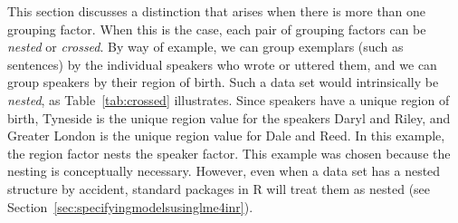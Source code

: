 \documentclass[a4paper,12pt]{article}
\begin{document}
This section discusses a distinction that arises when there is more than one grouping factor.
When this is the case, each pair of grouping factors can be \textit{nested} or \textit{crossed}.
By way of example, we can group exemplars (such as sentences) by the individual speakers who wrote or uttered them, and we can group speakers by their region of birth.
Such a data set would intrinsically be \textit{nested}, as Table~\ref{tab:crossed} illustrates.
Since speakers have a unique region of birth, Tyneside is the unique region value for the speakers Daryl and Riley, and Greater London is the unique region value for Dale and Reed.
In this example, the region factor nests the speaker factor.
This example was chosen because the nesting is conceptually necessary.
However, even when a data set has a nested structure by accident, standard packages in R will treat them as nested
(see Section~\ref{sec:specifyingmodelsusinglme4inr}).
\end{document}
